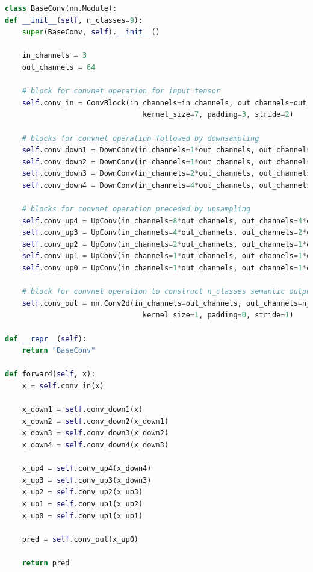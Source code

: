 \documentclass[11pt]{article}
\begin{document}
\begin{lstlisting}[language=Python, basicstyle=\scriptsize]
class BaseConv(nn.Module):
def __init__(self, n_classes=9):
    super(BaseConv, self).__init__()

    in_channels = 3
    out_channels = 64

    # block for convnet operation for input tensor
    self.conv_in = ConvBlock(in_channels=in_channels, out_channels=out_channels, 
                                kernel_size=7, padding=3, stride=2)

    # blocks for convnet operation followed by downsampling
    self.conv_down1 = DownConv(in_channels=1*out_channels, out_channels=1*out_channels)
    self.conv_down2 = DownConv(in_channels=1*out_channels, out_channels=2*out_channels)
    self.conv_down3 = DownConv(in_channels=2*out_channels, out_channels=4*out_channels)
    self.conv_down4 = DownConv(in_channels=4*out_channels, out_channels=8*out_channels)

    # blocks for convnet operation preceded by upsampling
    self.conv_up4 = UpConv(in_channels=8*out_channels, out_channels=4*out_channels)
    self.conv_up3 = UpConv(in_channels=4*out_channels, out_channels=2*out_channels)
    self.conv_up2 = UpConv(in_channels=2*out_channels, out_channels=1*out_channels)
    self.conv_up1 = UpConv(in_channels=1*out_channels, out_channels=1*out_channels)
    self.conv_up0 = UpConv(in_channels=1*out_channels, out_channels=1*out_channels)
    
    # block for convnet operation to construct n_classes semantic outputs
    self.conv_out = nn.Conv2d(in_channels=out_channels, out_channels=n_classes, 
                                kernel_size=1, padding=0, stride=1)

def __repr__(self):
    return "BaseConv"
    
def forward(self, x):
    x = self.conv_in(x)
    
    x_down1 = self.conv_down1(x)
    x_down2 = self.conv_down2(x_down1)
    x_down3 = self.conv_down3(x_down2)
    x_down4 = self.conv_down4(x_down3)
    
    x_up4 = self.conv_up4(x_down4)
    x_up3 = self.conv_up3(x_down3)
    x_up2 = self.conv_up2(x_up3)
    x_up1 = self.conv_up1(x_up2)
    x_up0 = self.conv_up1(x_up1)

    pred = self.conv_out(x_up0)

    return pred
\end{lstlisting}
\end{document}
